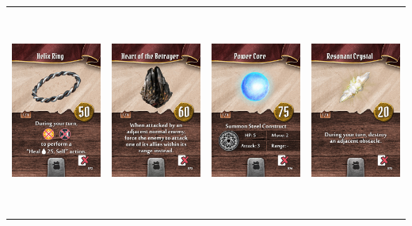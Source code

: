 \documentclass{minimal}
\begin{document}
{\begin{longtable}{llll}
\includegraphics[width=44mm,height=68mm]{./64-151/gh-130-helix-ring.png} &
\includegraphics[width=44mm,height=68mm]{./64-151/gh-131-heart-of-the-betrayer.png} &
\includegraphics[width=44mm,height=68mm]{./64-151/gh-132-power-core.png} &
\includegraphics[width=44mm,height=68mm]{./64-151/gh-133-resonant-crystal.png}\\ 

\end{longtable}}
\end{document}
